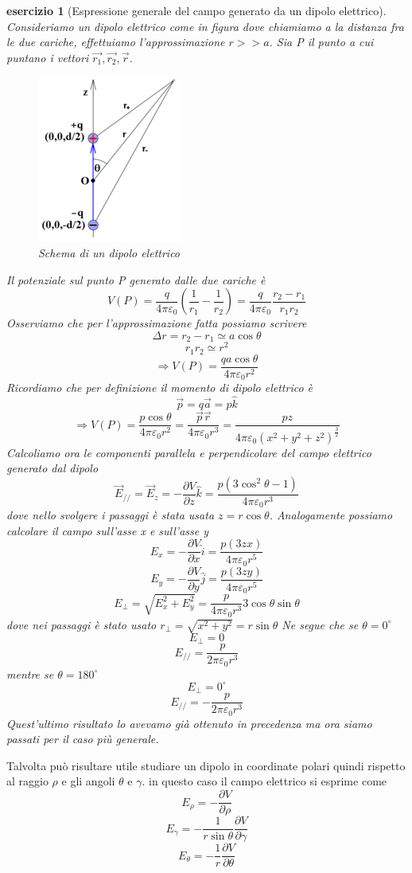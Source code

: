 \documentclass[10pt,a4paper]{article}
\newtheorem{esercizio}{esercizio}
\begin{document}
\begin{esercizio}[Espressione generale del campo generato da un dipolo elettrico]
	Consideriamo un dipolo elettrico come in figura dove chiamiamo a la distanza fra le due cariche, effettuiamo l'approssimazione \(r>>a\). Sia P il punto a cui puntano i vettori \(\vec{r_1}, \vec{r_2}, \vec{r}\). 
	\begin{figure}[h!]
		\centering
		\includegraphics[width=0.4\linewidth]{images/dipolo}
		\caption{Schema di un dipolo elettrico}
		\label{fig:dipolo}
	\end{figure}
	\FloatBarrier
	Il potenziale sul punto P generato dalle due cariche è
	\[V(P) = \frac{q}{4\pi\varepsilon_0}\left(\frac{1}{r_1}-\frac{1}{r_2}\right) =  \frac{q}{4\pi\varepsilon_0}\frac{r_2-r_1}{r_1r_2}\]
	Osserviamo che per l'approssimazione fatta possiamo scrivere
	\[\Delta r = r_2-r_1 \simeq a\cos\theta\]
	\[r_1r_2 \simeq r^2\]
	\[\Rightarrow V(P) = \frac{q a \cos\theta}{4\pi\varepsilon_0 r^2}\]
	Ricordiamo che per definizione il momento di dipolo elettrico è
	\[\vec{p} = q\vec{a} = p\hat{k}\]
	\[\Rightarrow V(P) = \frac{p \cos\theta}{4\pi\varepsilon_0 r^2} = \frac{\vec{p}\vec{r}}{4\pi\varepsilon_0 r^3} = \frac{pz}{4\pi\varepsilon_0 (x^2+y^2+z^2)^{\frac{3}{2}}}\]
	Calcoliamo ora le componenti parallela e perpendicolare del campo elettrico generato dal dipolo
	\[\vec{E}_{//} = \vec{E}_z = -\frac{\partial V}{\partial z} \hat{k} = \frac{p(3\cos^2\theta-1)}{4\pi\varepsilon_0 r^3}\]
	dove nello svolgere i passaggi è stata usata \(z = r\cos\theta\). Analogamente possiamo calcolare il campo sull'asse x e sull'asse y
	\[E_x = -\frac{\partial V}{\partial x} \hat{i}=\frac{p(3zx)}{4\pi\varepsilon_0 r^5}\]
	\[E_y = -\frac{\partial V}{\partial y} \hat{j}=\frac{p(3zy)}{4\pi\varepsilon_0 r^5}\]
	\[E_{\perp} = \sqrt{E_x^2+E_y^2} = \frac{p}{4\pi\varepsilon_0r^3}3\cos\theta\sin\theta\]
	dove nei passaggi è stato usato \(r_{\perp} = \sqrt{x^2+y^2} = r\sin\theta\)
	Ne segue che se \(\theta = 0^\circ \)
	\[E_{\perp} = 0\]
	\[E_{//} = \frac{p}{2\pi\varepsilon_0r^3}\]
	mentre se \(\theta = 180^\circ\)
	\[E_{\perp} = 0^\circ\]
	\[E_{//} = -\frac{p}{2\pi\varepsilon_0r^3}\]
	Quest'ultimo risultato lo avevamo già ottenuto in precedenza ma ora siamo passati per il caso più generale.
\end{esercizio}
Talvolta può risultare utile studiare un dipolo in coordinate polari quindi rispetto al raggio $\rho$ e gli angoli $\theta$ e $\gamma$. in questo caso il campo elettrico si esprime come 
\[E_\rho = -\frac{\partial V}{\partial \rho}\]
\[E_\gamma = -\frac{1}{r\sin\theta}\frac{\partial V}{\partial \gamma}\]
\[E_\theta = -\frac{1}{r}\frac{\partial V}{\partial \theta}\]
\end{document}

